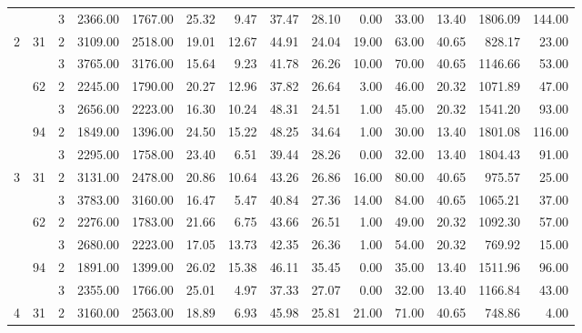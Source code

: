 \begin{tabular}{lllrrrrrrrrrrr}
  &    & 3 &  2366.00 &   1767.00 & 25.32 &    9.47 &   37.47 &   28.10 &    0.00 &   33.00 &   13.40 & 1806.09 &   144.00 \\
\cline{1-14}
\cline{2-14}
\multirow{6}{*}{2} & \multirow{2}{*}{31} & 2 &  3109.00 &   2518.00 & 19.01 &   12.67 &   44.91 &   24.04 &   19.00 &   63.00 &   40.65 &  828.17 &    23.00 \\
  &    & 3 &  3765.00 &   3176.00 & 15.64 &    9.23 &   41.78 &   26.26 &   10.00 &   70.00 &   40.65 & 1146.66 &    53.00 \\
\cline{2-14}
  & \multirow{2}{*}{62} & 2 &  2245.00 &   1790.00 & 20.27 &   12.96 &   37.82 &   26.64 &    3.00 &   46.00 &   20.32 & 1071.89 &    47.00 \\
  &    & 3 &  2656.00 &   2223.00 & 16.30 &   10.24 &   48.31 &   24.51 &    1.00 &   45.00 &   20.32 & 1541.20 &    93.00 \\
\cline{2-14}
  & \multirow{2}{*}{94} & 2 &  1849.00 &   1396.00 & 24.50 &   15.22 &   48.25 &   34.64 &    1.00 &   30.00 &   13.40 & 1801.08 &   116.00 \\
  &    & 3 &  2295.00 &   1758.00 & 23.40 &    6.51 &   39.44 &   28.26 &    0.00 &   32.00 &   13.40 & 1804.43 &    91.00 \\
\cline{1-14}
\cline{2-14}
\multirow{6}{*}{3} & \multirow{2}{*}{31} & 2 &  3131.00 &   2478.00 & 20.86 &   10.64 &   43.26 &   26.86 &   16.00 &   80.00 &   40.65 &  975.57 &    25.00 \\
  &    & 3 &  3783.00 &   3160.00 & 16.47 &    5.47 &   40.84 &   27.36 &   14.00 &   84.00 &   40.65 & 1065.21 &    37.00 \\
\cline{2-14}
  & \multirow{2}{*}{62} & 2 &  2276.00 &   1783.00 & 21.66 &    6.75 &   43.66 &   26.51 &    1.00 &   49.00 &   20.32 & 1092.30 &    57.00 \\
  &    & 3 &  2680.00 &   2223.00 & 17.05 &   13.73 &   42.35 &   26.36 &    1.00 &   54.00 &   20.32 &  769.92 &    15.00 \\
\cline{2-14}
  & \multirow{2}{*}{94} & 2 &  1891.00 &   1399.00 & 26.02 &   15.38 &   46.11 &   35.45 &    0.00 &   35.00 &   13.40 & 1511.96 &    96.00 \\
  &    & 3 &  2355.00 &   1766.00 & 25.01 &    4.97 &   37.33 &   27.07 &    0.00 &   32.00 &   13.40 & 1166.84 &    43.00 \\
\cline{1-14}
\cline{2-14}
\multirow{6}{*}{4} & \multirow{2}{*}{31} & 2 &  3160.00 &   2563.00 & 18.89 &    6.93 &   45.98 &   25.81 &   21.00 &   71.00 &   40.65 &  748.86 &     4.00 \\

\end{tabular}
